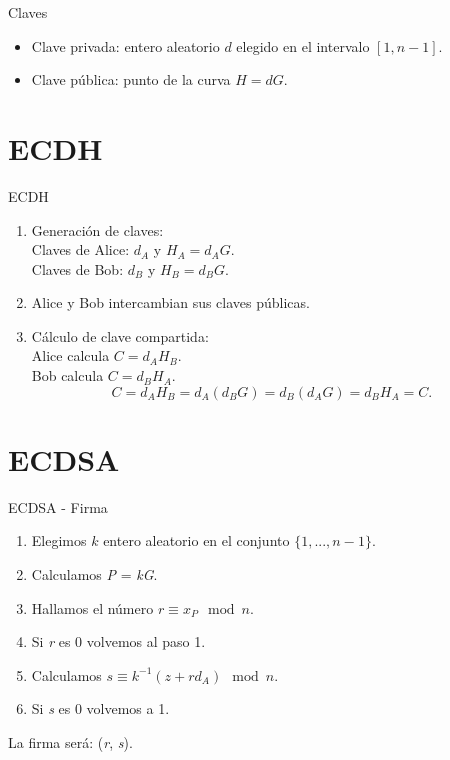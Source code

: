 \documentclass[12pt]{beamer}
\begin{document}
\begin{frame}[fragile]{Claves}
 \begin{itemize}
\item Clave privada: entero aleatorio $d$ elegido en el intervalo $[1,n-1]$.
\item Clave pública: punto de la curva $H = dG$.
\end{itemize}
\end{frame}

\section{ECDH}\label{ecdh}

\begin{frame}[fragile]{ECDH}
 \vspace{5mm}
  \begin{enumerate}
  \item Generación de claves:\\
   \quad Claves de Alice: $d_A$ y $H_A = d_AG$.\\
   \quad Claves de Bob: $d_B$ y $H_B = d_BG$. 

\item Alice y Bob intercambian sus claves públicas.\\
\item Cálculo de clave compartida:\\
  \quad Alice calcula $C = d_AH_B$.\\
  \quad Bob calcula $C = d_BH_A$.\\
  \[C = d_AH_B = d_A(d_BG) = d_B(d_AG) = d_BH_A = C.\]
\end{enumerate}

\end{frame}

\section{ECDSA}\label{ecdsa}
\begin{frame}[fragile]{ECDSA - Firma}
\vspace{5mm}
  \begin{enumerate}
	\item  Elegimos $ k $ entero aleatorio en el conjunto $ \{ 1, ..., n-1\} $.
	\item Calculamos \textit{P} = \textit{kG}.
	\item Hallamos el número \textit{$r \equiv x_{P} \mod n$}.
	\item Si \textit{r} es 0 volvemos al paso 1.
	\item Calculamos $s \equiv k^{-1}(z + rd_{A}) \mod n$.
	\item Si \textit{s} es 0 volvemos a 1.
  \end{enumerate}
  \vspace{2mm}
  La firma será: (\textit{r}, \textit{s}).
  
\end{frame}
\end{document}

